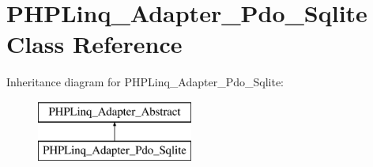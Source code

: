\hypertarget{class_p_h_p_linq___adapter___pdo___sqlite}{\section{\-P\-H\-P\-Linq\-\_\-\-Adapter\-\_\-\-Pdo\-\_\-\-Sqlite \-Class \-Reference}
\label{class_p_h_p_linq___adapter___pdo___sqlite}
}
\-Inheritance diagram for \-P\-H\-P\-Linq\-\_\-\-Adapter\-\_\-\-Pdo\-\_\-\-Sqlite\-:\begin{figure}[H]
\begin{center}
\leavevmode
\includegraphics[height=2.000000cm]{class_p_h_p_linq___adapter___pdo___sqlite}
\end{center}
\end{figure}
